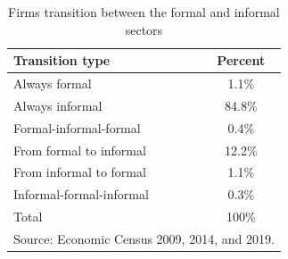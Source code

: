 \begin{table}[ht]
\centering
\caption{Firms transition between the formal and informal sectors}
\label{firms_transition}
\begin{tabular}{l*{1}{c}}
\hline\hline
Transition type          & Percent\\
\hline
Always formal            & 1.1\%  \\
Always informal          & 84.8\% \\
Formal-informal-formal   & 0.4\%  \\
From formal to informal  & 12.2\% \\
From informal to formal  & 1.1\%  \\
Informal-formal-informal & 0.3\%  \\
Total                    & 100\% \\
\hline\hline
\multicolumn{2}{l}{\footnotesize Source: Economic Census 2009, 2014, and 2019.}
\end{tabular}
\end{table}